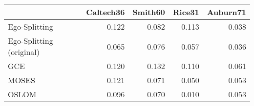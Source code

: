 \begin{tabular}{lrrrr}
\toprule
{} & Caltech36 & Smith60 & Rice31 & Auburn71 \\
\midrule
Ego-Splitting            &     0.122 &   0.082 &  0.113 &    0.038 \\
Ego-Splitting (original) &     0.065 &   0.076 &  0.057 &    0.036 \\
GCE                      &     0.120 &   0.132 &  0.110 &    0.061 \\
MOSES                    &     0.121 &   0.071 &  0.050 &    0.053 \\
OSLOM                    &     0.096 &   0.070 &  0.010 &    0.053 \\
\bottomrule
\end{tabular}
